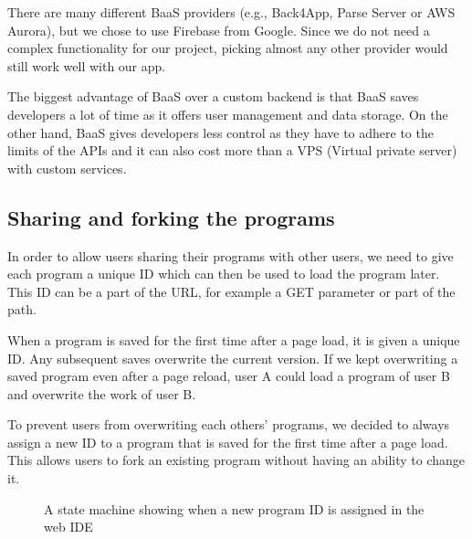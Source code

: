 There are many different BaaS providers (e.g., Back4App, Parse Server or AWS Aurora), but we chose to use Firebase \cite{Firebase} from Google. Since we do not
need a complex functionality for our project, picking almost any other provider would still work well with our app.

The biggest advantage of BaaS over a custom backend is that BaaS saves developers a lot of time as it offers user management and data storage.
On the other hand, BaaS gives developers less control as they have to adhere to the limits of the APIs and it can also cost more than a VPS (Virtual private server)
with custom services.

\subsection{Sharing and forking the programs}
\label{chap2:program_id}

In order to allow users sharing their programs with other users, we need to give each program a unique ID which can then be used to load the program later.
This ID can be a part of the URL, for example a GET parameter or part of the path.

When a program is saved for the first time after a page load, it is given a unique ID. Any subsequent saves overwrite the current version. If we kept overwriting
a saved program even after a page reload, user A could load a program of user B and overwrite the work of user B.

To prevent users from overwriting each others' programs, we decided to always assign a new ID to a program that is saved for the first time after
a page load. This allows users to fork an existing program without having an ability to change it.

\begin{figure}[!hbt]
    \centering
	\caption{A state machine showing when a new program ID is assigned in the web IDE}
	\label{fig:chap2:page_url}
\end{figure}

